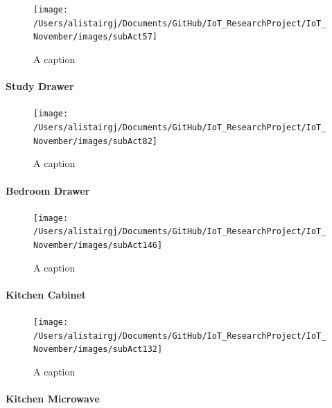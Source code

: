 \documentclass[11pt,]{article}
\let\oldparagraph\paragraph
\renewcommand{\paragraph}[1]{\oldparagraph{#1}\mbox{}}
\begin{document}
\begin{figure}[H]

{\centering \texttt{[image: /Users/alistairgj/Documents/GitHub/IoT\_ResearchProject/IoT\_November/images/subAct57]} 

}

\caption{A caption}\label{fig:subAct57}
\end{figure}

\hypertarget{study-drawer}{%
\paragraph{Study Drawer}\label{study-drawer}}

\begin{figure}[H]

{\centering \texttt{[image: /Users/alistairgj/Documents/GitHub/IoT\_ResearchProject/IoT\_November/images/subAct82]} 

}

\caption{A caption}\label{fig:subAct82}
\end{figure}

\hypertarget{bedroom-drawer}{%
\paragraph{Bedroom Drawer}\label{bedroom-drawer}}

\begin{figure}[H]

{\centering \texttt{[image: /Users/alistairgj/Documents/GitHub/IoT\_ResearchProject/IoT\_November/images/subAct146]} 

}

\caption{A caption}\label{fig:subAct146}
\end{figure}

\hypertarget{kitchen-cabinet}{%
\paragraph{Kitchen Cabinet}\label{kitchen-cabinet}}

\begin{figure}[H]

{\centering \texttt{[image: /Users/alistairgj/Documents/GitHub/IoT\_ResearchProject/IoT\_November/images/subAct132]} 

}

\caption{A caption}\label{fig:subAct132}
\end{figure}

\hypertarget{kitchen-microwave}{%
\paragraph{Kitchen Microwave}\label{kitchen-microwave}}
\end{document}
